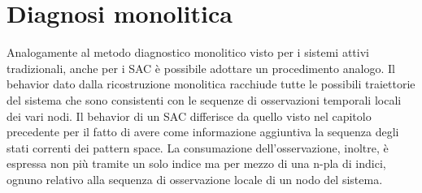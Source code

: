 \newpage
\section{Diagnosi monolitica}
Analogamente al metodo diagnostico monolitico visto per i sistemi attivi tradizionali, anche per i SAC è possibile adottare un procedimento analogo. Il behavior dato dalla ricostruzione monolitica racchiude tutte le possibili traiettorie del sistema che sono consistenti con le sequenze di osservazioni temporali locali dei vari nodi.
Il behavior di un SAC differisce da quello visto nel capitolo precedente per il fatto di avere come informazione aggiuntiva la sequenza degli stati correnti dei pattern space. La consumazione dell'osservazione, inoltre, è espressa non più tramite un solo indice ma per mezzo di una n-pla di indici, ognuno relativo alla sequenza di osservazione locale di un nodo del sistema.

